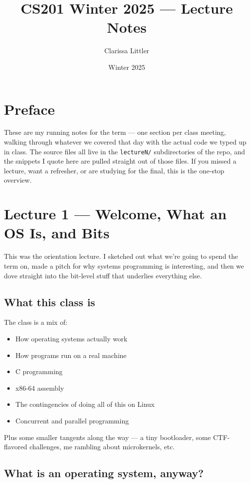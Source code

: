 \documentclass[11pt]{article}
\title{CS201 Winter 2025 --- Lecture Notes}
\author{Clarissa Littler}
\date{Winter 2025}
\begin{document}
\maketitle

\section*{Preface}

These are my running notes for the term --- one section per class
meeting, walking through whatever we covered that day with the
actual code we typed up in class. The source files all live in the
\texttt{lectureN/} subdirectories of the repo, and the snippets I
quote here are pulled straight out of those files. If you missed a
lecture, want a refresher, or are studying for the final, this is
the one-stop overview.

\tableofcontents

\section{Lecture 1 --- Welcome, What an OS Is, and Bits}

This was the orientation lecture. I sketched out what we're going to
spend the term on, made a pitch for why systems programming is
interesting, and then we dove straight into the bit-level stuff that
underlies everything else.

\subsection*{What this class is}

The class is a mix of:
\begin{itemize}
  \item How operating systems actually work
  \item How programs run on a real machine
  \item C programming
  \item x86-64 assembly
  \item The contingencies of doing all of this on Linux
  \item Concurrent and parallel programming
\end{itemize}
Plus some smaller tangents along the way --- a tiny bootloader, some
CTF-flavored challenges, me rambling about microkernels, etc.

\subsection*{What is an operating system, anyway?}
\end{document}

